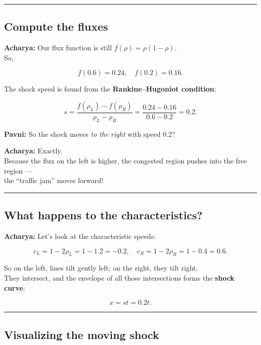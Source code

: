\documentclass[
  letterpaper,
]{book}
\begin{document}
\begin{center}\rule{0.5\linewidth}{0.5pt}\end{center}

\subsection{Compute the fluxes}\label{compute-the-fluxes}

\textbf{Acharya:} Our flux function is still
\(f(\rho) = \rho(1-\rho)\).\\
So,

\[
f(0.6) = 0.24, \quad f(0.2) = 0.16.
\]

The shock speed is found from the \textbf{Rankine--Hugoniot condition}:

\[
s = \frac{f(\rho_L) - f(\rho_R)}{\rho_L - \rho_R}
= \frac{0.24 - 0.16}{0.6 - 0.2} = 0.2.
\]

\textbf{Pavni:} So the shock moves \emph{to the right} with speed 0.2?

\textbf{Acharya:} Exactly.\\
Because the flux on the left is higher, the congested region pushes into
the free region ---\\
the ``traffic jam'' moves forward!

\begin{center}\rule{0.5\linewidth}{0.5pt}\end{center}

\subsection{What happens to the
characteristics?}\label{what-happens-to-the-characteristics}

\textbf{Acharya:} Let's look at the characteristic speeds:

\[
c_L = 1 - 2\rho_L = 1 - 1.2 = -0.2, \quad
c_R = 1 - 2\rho_R = 1 - 0.4 = 0.6.
\]

So on the left, lines tilt gently left; on the right, they tilt right.\\
They intersect, and the envelope of all those intersections forms the
\textbf{shock curve}:

\[
x = s t = 0.2t.
\]

\begin{center}\rule{0.5\linewidth}{0.5pt}\end{center}

\subsection{Visualizing the moving
shock}\label{visualizing-the-moving-shock}
\end{document}
